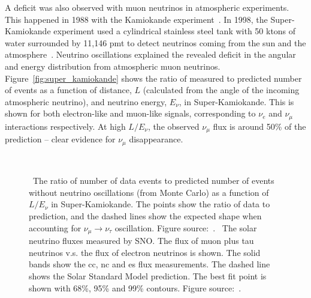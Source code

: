A deficit was also observed with muon neutrinos in atmospheric experiments. This happened in 1988 with the Kamiokande experiment~\cite{kamiokande}. 
In 1998, the Super-Kamiokande experiment used a cylindrical stainless steel tank with 50 ktons of water surrounded by 11,146 \acrfull{pmt} to detect neutrinos coming from the sun and the atmosphere~\cite{super_kamiokande}. Neutrino oscillations explained the revealed deficit in the angular and energy distribution from atmospheric muon neutrinos. Figure~\ref{fig:super_kamiokande} shows the ratio of measured to predicted number of events as a function of distance, $L$ (calculated from the angle of the incoming atmospheric neutrino), and neutrino energy, $E_\nu$, in Super-Kamiokande. This is shown for both electron-like and muon-like signals, corresponding to $\nu_e$ and $\nu_\mu$ interactions respectively. At high $L/E_\nu$, the observed $\nu_\mu$ flux is around 50\% of the prediction – clear evidence for $\nu_\mu$ disappearance.

\begin{figure}[t]
\centering
{} \quad
{} \\
\caption[Super-Kamiokande and SNO Oscillations]{\protect{}~The ratio of number of data events to predicted number of events without neutrino oscillations (from Monte Carlo) as a function of $L/E_\nu$ in Super-Kamiokande. The points show the ratio of data to prediction, and the dashed lines show the expected shape when accounting for $\nu_\mu \rightarrow \nu_\tau$ oscillation. Figure source:~\cite{superk}.
\protect{}~The solar neutrino fluxes measured by SNO. The flux of muon plus tau neutrinos v.s. the flux of electron neutrinos is shown. The solid bands show the \acrshort{cc}, \acrshort{nc} and \acrshort{es} flux measurements. The dashed line shows the Solar Standard Model prediction. The best fit point is shown with 68\%, 95\% and 99\% contours. Figure source:~\cite{sno}.}
\label{fig:superk_sno}
\end{figure}

